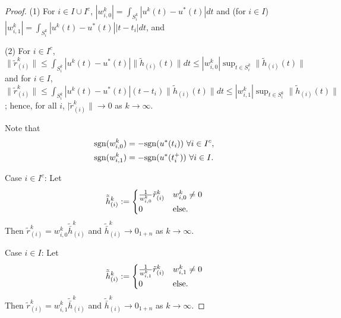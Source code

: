 \documentclass[letterpaper,10pt,conference]{ieeeconf}
\begin{document}
\begin{proof}
\noindent 
(1) For $i\in I\cup I^c$, $|w_{i,0}^k|=\int_{S_i^k} |u^k(t)-u^*(t)|dt$ 
and (for $i\in I$) $|w_{i,1}^k|= \int_{S_i^k} |u^k(t)-u^*(t)| |t-t_i|dt$, and

\noindent
(2) For $i\in I^c$, 
$\|\tilde r_{(i)}^k\|\leq \int_{S_i^k}|u^k(t)-u^*(t)|\|\tilde h_{(i)}(t)\|dt
\leq|w_{i,0}^k| \sup_{t\in S_i^k}\|\tilde h_{(i)}(t)\|$
and for $i\in I$,
$\|\tilde r_{(i)}^k\|\leq \int_{S_i^k}|u^k(t)-u^*(t)|(t-t_i)\|\tilde h_{(i)}(t)\|dt
\leq |w_{i,1}^k| \sup_{t\in S_i^k}\|\tilde h_{(i)}(t)\|$;
hence, for all $i$, $|\tilde r_{(i)}^k\|\to0$ as $k\to\infty$.

\noindent
Note that
\begin{equation}
\label{eq:sgn(w)}
\begin{aligned}
{\rm sgn}(w_{i,0}^k)&=-{\rm sgn}(u^*(t_i))~\forall i\in I^c,\\
{\rm sgn}(w_{i,1}^k)&=-{\rm sgn}(u^*(t_i^+))~\forall i\in I.
\end{aligned}
\end{equation}


\smallskip\noindent
Case $i\in I^c$: Let 
\[
\tilde{\bar h}_{(i)}^k := 
\begin{cases}
\frac{1}{w_{i,0}^k} \tilde r_{(i)}^k & w_{i,0}^k\not=0 \\
0 & {\rm else.}
\end{cases}
\]
Then $\tilde r_{(i)}^k=w_{i,0}^k \tilde{\bar h}_{(i)}^k$ and
$\tilde{\bar h}_{(i)}^k\to0_{1+n}$ as $k\to\infty$.

\smallskip\noindent
Case $i\in I$: Let
\[
\tilde{\bar h}_{(i)}^k := 
\begin{cases}
\frac{1}{w_{i,1}^k} \tilde r_{(i)}^k & w_{i,1}^k\not=0 \\
0 & {\rm else.}
\end{cases}
\]
Then $\tilde r_{(i)}^k=w_{i,1}^k \tilde{\bar h}_{(i)}^k$ and 
$\tilde{\bar h}_{(i)}^k\to0_{1+n}$ as $k\to\infty$.


\end{proof}
\end{document}
